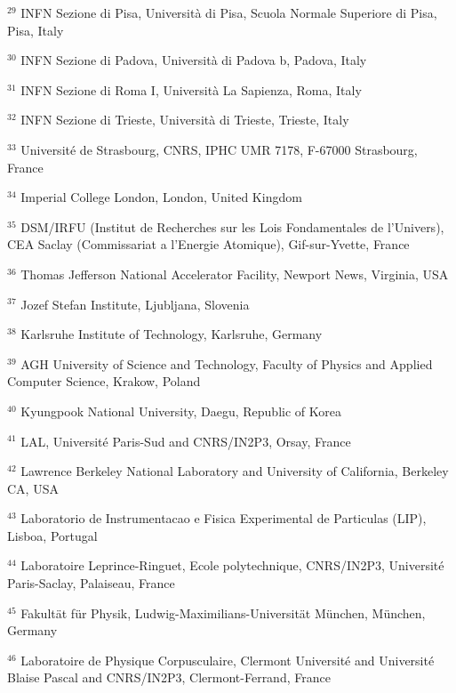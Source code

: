 \par {\footnotesize $^{29}$ INFN Sezione di Pisa, Università di Pisa, Scuola Normale Superiore di Pisa, Pisa, Italy}
\par {\footnotesize $^{30}$ INFN Sezione di Padova, Università di Padova b, Padova, Italy}
\par {\footnotesize $^{31}$ INFN Sezione di Roma I, Università La Sapienza, Roma, Italy}
\par {\footnotesize $^{32}$ INFN Sezione di Trieste, Università di Trieste, Trieste, Italy}
\par {\footnotesize $^{33}$ Université de Strasbourg, CNRS, IPHC UMR 7178, F-67000 Strasbourg, France}
\par {\footnotesize $^{34}$ Imperial College London, London, United Kingdom}
\par {\footnotesize $^{35}$ DSM/IRFU (Institut de Recherches sur les Lois Fondamentales de l’Univers), CEA Saclay (Commissariat a l’Energie Atomique), Gif-sur-Yvette, France}
\par {\footnotesize $^{36}$ Thomas Jefferson National Accelerator Facility, Newport News, Virginia, USA}
\par {\footnotesize $^{37}$ Jozef Stefan Institute, Ljubljana, Slovenia}
\par {\footnotesize $^{38}$ Karlsruhe Institute of Technology, Karlsruhe, Germany}
\par {\footnotesize $^{39}$ AGH University of Science and Technology, Faculty of Physics and Applied Computer Science, Krakow, Poland}
\par {\footnotesize $^{40}$ Kyungpook National University, Daegu, Republic of Korea}
\par {\footnotesize $^{41}$ LAL, Université Paris-Sud and CNRS/IN2P3, Orsay, France}
\par {\footnotesize $^{42}$ Lawrence Berkeley National Laboratory and University of California, Berkeley CA, USA}
\par {\footnotesize $^{43}$ Laboratorio de Instrumentacao e Fisica Experimental de Particulas (LIP), Lisboa, Portugal}
\par {\footnotesize $^{44}$ Laboratoire Leprince-Ringuet, Ecole polytechnique, CNRS/IN2P3, Université Paris-Saclay, Palaiseau, France}
\par {\footnotesize $^{45}$ Fakultät für Physik, Ludwig-Maximilians-Universität München, München, Germany}
\par {\footnotesize $^{46}$ Laboratoire de Physique Corpusculaire, Clermont Université and Université Blaise Pascal and CNRS/IN2P3, Clermont-Ferrand, France}

